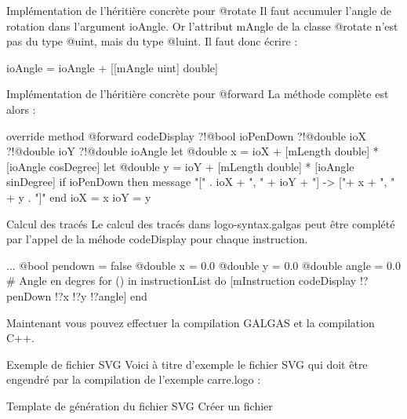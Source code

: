 Implémentation de l'héritière concrète pour @rotate
Il faut accumuler l'angle de rotation dans l'argument ioAngle. Or l'attribut mAngle de la classe @rotate n'est pas du type @uint, mais du type @luint. Il faut donc écrire :
\begin{galgascode}
ioAngle = ioAngle + [[mAngle uint] double]
\end{galgascode}

Implémentation de l'héritière concrète pour @forward
La méthode complète est alors :

\begin{galgascode}
override method @forward codeDisplay
  ?!@bool ioPenDown
  ?!@double ioX
  ?!@double ioY
  ?!@double ioAngle
{
  let @double x = ioX + [mLength double] * [ioAngle cosDegree]
  let @double y = ioY + [mLength double] * [ioAngle sinDegree]
  if ioPenDown then
    message "[" . ioX + ", " + ioY + "] -> ["+ x + ", " + y . "]\n"
  end
  ioX = x
  ioY = y
}
\end{galgascode}

Calcul des tracés
Le calcul des tracés dans logo-syntax.galgas peut être complété par l'appel de la méhode codeDisplay pour chaque instruction.
\begin{galgascode}
  ...
  @bool pendown = false
  @double x = 0.0
  @double y = 0.0
  @double angle = 0.0 # Angle en degres
  for () in instructionList do
    [mInstruction codeDisplay !?penDown !?x !?y !?angle]
  end
\end{galgascode}

Maintenant vous pouvez effectuer la compilation GALGAS et la compilation C++.

Exemple de fichier SVG
Voici à titre d'exemple le fichier SVG qui doit être engendré par la compilation de l'exemple carre.logo :


Template de génération du fichier SVG
Créer un fichier


